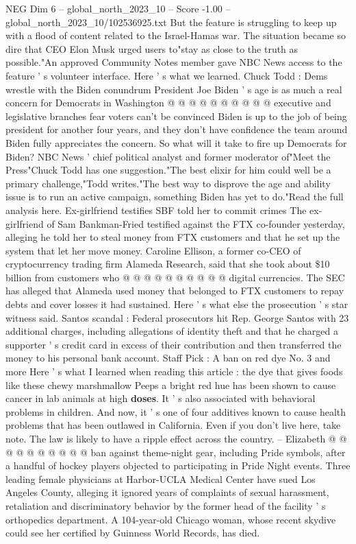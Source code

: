 \begin{textsample}{NEG Dim 6 – global\_north\_2023\_10 – Score -1.00 – global\_north\_2023\_10/102536925.txt}
But the feature is struggling to keep up with a flood of content related to the Israel-Hamas war.
The situation became so dire that CEO Elon Musk urged users to"stay as close to the truth as possible."An approved Community Notes member gave NBC News access to the feature ' s volunteer interface.
Here ' s what we learned.
Chuck Todd : Dems wrestle with the Biden conundrum President Joe Biden ' s age is as much a real concern for Democrats in Washington @ @ @ @ @ @ @ @ @ @ executive and legislative branches fear voters can't be convinced Biden is up to the job of being president for another four years, and they don't have confidence the team around Biden fully appreciates the concern.
So what will it take to fire up Democrats for Biden?
NBC News ' chief political analyst and former moderator of"Meet the Press"Chuck Todd has one suggestion."The best elixir for him could well be a primary challenge,"Todd writes."The best way to disprove the age and ability issue is to run an active campaign, something Biden has yet to do."Read the full analysis here.
Ex-girlfriend testifies SBF told her to commit crimes The ex-girlfriend of Sam Bankman-Fried testified against the FTX co-founder yesterday, alleging he told her to steal money from FTX customers and that he set up the system that let her move money.
Caroline Ellison, a former co-CEO of cryptocurrency trading firm Alameda Research, said that she took about \$10 billion from customers who @ @ @ @ @ @ @ @ @ @ digital currencies.
The SEC has alleged that Alameda used money that belonged to FTX customers to repay debts and cover losses it had sustained.
Here ' s what else the prosecution ' s star witness said.
Santos scandal : Federal prosecutors hit Rep.
George Santos with 23 additional charges, including allegations of identity theft and that he charged a supporter ' s credit card in excess of their contribution and then transferred the money to his personal bank account.
Staff Pick : A ban on red dye No. 3 and more Here ' s what I learned when reading this article : the dye that gives foods like these chewy marshmallow Peeps a bright red hue has been shown to cause cancer in lab animals at high \textbf{doses}.
It ' s also associated with behavioral problems in children.
And now, it ' s one of four additives known to cause health problems that has been outlawed in California.
Even if you don't live here, take note.
The law is likely to have a ripple effect across the country. -- Elizabeth @ @ @ @ @ @ @ @ @ @ ban against theme-night gear, including Pride symbols, after a handful of hockey players objected to participating in Pride Night events.
Three leading female physicians at Harbor-UCLA Medical Center have sued Los Angeles County, alleging it ignored years of complaints of sexual harassment, retaliation and discriminatory behavior by the former head of the facility ' s orthopedics department.
A 104-year-old Chicago woman, whose recent skydive could see her certified by Guinness World Records, has died.

\end{textsample}
